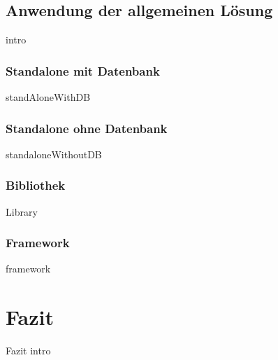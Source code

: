 \documentclass{article}
\begin{document}
    \newpage
    \subsection{Anwendung der allgemeinen Lösung}
        {intro}
        
        \newpage
        \subsubsection{Standalone mit Datenbank}
            {standAloneWithDB}

        \newpage
        \subsubsection{Standalone ohne Datenbank}
            {standaloneWithoutDB}

        \newpage
        \subsubsection{Bibliothek}
            {Library}
        
        \newpage
        \subsubsection{Framework}
            {framework}
    
\section{Fazit}
    {Fazit}
    {intro}




\newpage
\printbibliography[heading = bibintoc, title = Literaturverzeichnis]    %

\nocite{MF_isHighQuilatySoftwareWorthTheCost}
\nocite{enterprisePatterns}
\nocite{cleanCode}
\nocite{CiCd}
\nocite{frameworkOnline1}

\nocite{frameworkOnline2}

\nocite{frameworkOnline3}

\end{document}
